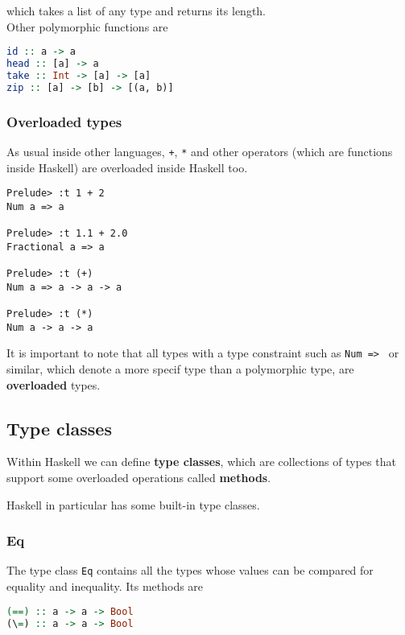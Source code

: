which takes a list of any type and returns its length. \\
Other polymorphic functions are 

\begin{lstlisting}[language=haskell]
id :: a -> a
head :: [a] -> a
take :: Int -> [a] -> [a]
zip :: [a] -> [b] -> [(a, b)]
\end{lstlisting}

\subsubsection{Overloaded types}
As usual inside other languages, \texttt{+}, \texttt{*} and other operators (which are functions inside Haskell) are overloaded inside Haskell too. 

\begin{lstlisting}
Prelude> :t 1 + 2
Num a => a

Prelude> :t 1.1 + 2.0
Fractional a => a

Prelude> :t (+)
Num a => a -> a -> a

Prelude> :t (*)
Num a -> a -> a
\end{lstlisting}

It is important to note that all types with a type constraint such as \texttt{Num => } or similar, which denote a more specif type than a polymorphic type, are \textbf{overloaded} types.


\subsection{Type classes}
Within Haskell we can define \textbf{type classes}, which are collections of types that support some overloaded operations called \textbf{methods}.
\linebreak \linebreak

Haskell in particular has some built-in type classes. 

\subsubsection{Eq}
The type class \texttt{Eq} contains all the types whose values can be compared for equality and inequality. Its methods are

\begin{lstlisting}[language=haskell]
(==) :: a -> a -> Bool
(\=) :: a -> a -> Bool
\end{lstlisting}

